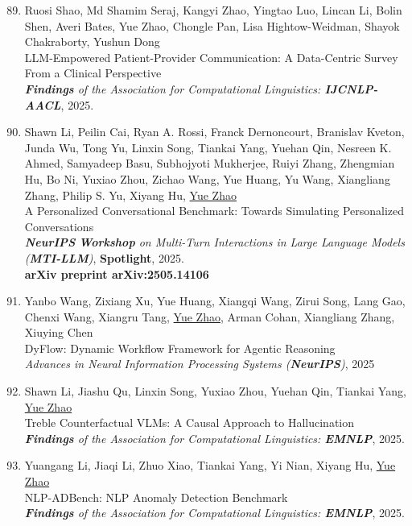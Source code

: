 \documentclass[margin,line,pifont,palatino,courier]{res}
\newenvironment{benumerate}[1]{
    \let\oldItem\item
    \def\item{\addtocounter{enumi}{-2}\oldItem}
    \begin{enumerate}[leftmargin=0.25in,label=\textcolor{uscred}{\arabic*.}]
    \setcounter{enumi}{#1}
    \addtocounter{enumi}{1}
}{
    \end{enumerate}
}
\begin{document}
\begin{resume}
\begin{benumerate}{88}
    \item Ruosi Shao, Md Shamim Seraj, Kangyi Zhao, Yingtao Luo, Lincan Li, Bolin Shen, Averi Bates, Yue Zhao, Chongle Pan, Lisa Hightow-Weidman, Shayok Chakraborty, Yushun Dong\\
    LLM-Empowered Patient-Provider Communication: A Data-Centric Survey From a Clinical Perspective\\
    \textit{\textbf{Findings} of the Association for Computational Linguistics: \textbf{IJCNLP-AACL}}, 2025.

    \item Shawn Li, Peilin Cai, Ryan A. Rossi, Franck Dernoncourt, Branislav Kveton, Junda Wu, Tong Yu, Linxin Song, Tiankai Yang, Yuehan Qin, Nesreen K. Ahmed, Samyadeep Basu, Subhojyoti Mukherjee, Ruiyi Zhang, Zhengmian Hu, Bo Ni, Yuxiao Zhou, Zichao Wang, Yue Huang, Yu Wang, Xiangliang Zhang, Philip S. Yu, Xiyang Hu, \underline{Yue Zhao}\\
    A Personalized Conversational Benchmark: Towards Simulating Personalized Conversations\\
    \textit{\textbf{NeurIPS} \textbf{Workshop} on Multi-Turn Interactions in Large Language Models (\textbf{MTI-LLM})}, \faAward \xspace \textbf{Spotlight}, 2025.\\
    \textbf{arXiv preprint arXiv:2505.14106}

    \item 
    Yanbo Wang, Zixiang Xu, Yue Huang, Xiangqi Wang, Zirui Song, Lang Gao, Chenxi Wang, Xiangru Tang, \underline{Yue Zhao}, Arman Cohan, Xiangliang Zhang, Xiuying Chen \\
    DyFlow: Dynamic Workflow Framework for Agentic Reasoning \\
    {\textit{Advances in Neural Information Processing Systems (\textbf{NeurIPS})}, 2025}
    
    \item Shawn Li, Jiashu Qu, Linxin Song, Yuxiao Zhou, Yuehan Qin, Tiankai Yang, \underline{Yue Zhao}\\
    Treble Counterfactual VLMs: A Causal Approach to Hallucination\\
    \textit{\textbf{Findings} of the Association for Computational Linguistics: \textbf{EMNLP}}, 2025.
    
    \item Yuangang Li, Jiaqi Li, Zhuo Xiao, Tiankai Yang, Yi Nian, Xiyang Hu, \underline{Yue Zhao}\\
    NLP-ADBench: NLP Anomaly Detection Benchmark\\
    \textit{\textbf{Findings} of the Association for Computational Linguistics: \textbf{EMNLP}}, 2025.



\end{benumerate}
\end{resume}
\end{document}
